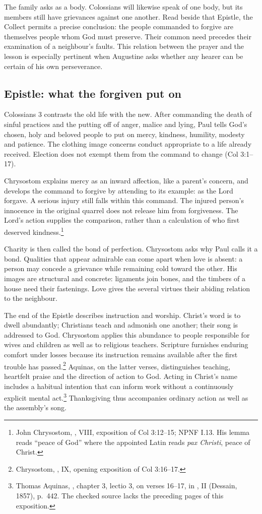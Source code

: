 The family asks as a body. Colossians will likewise speak of one body, but
its members still have grievances against one another. Read beside that
Epistle, the Collect permits a precise conclusion: the people commanded
to forgive are themselves people whom God must preserve. Their common
need precedes their examination of a neighbour's faults. This relation
between the prayer and the lesson is especially pertinent when Augustine
asks whether any hearer can be certain of his own perseverance.

\subsection{Epistle: what the forgiven put on}
Colossians 3 contrasts the old life with the new. After commanding the
death of sinful practices and the putting off of anger, malice and lying,
Paul tells God's chosen, holy and beloved people to put on mercy,
kindness, humility, modesty and patience. The clothing image concerns
conduct appropriate to a life already received. Election does not exempt
them from the command to change (Col 3:1--17).

Chrysostom explains mercy as an inward affection, like a parent's concern,
and develops the command to forgive by attending to its example: as the
Lord forgave. A serious injury still falls within this command. The
injured person's innocence in the original quarrel does not release him
from forgiveness. The Lord's action supplies the comparison, rather than
a calculation of who first deserved kindness.\footnote{John Chrysostom,
, VIII, exposition of Col 3:12--15;
NPNF I.13. His lemma reads ``peace of God'' where the appointed Latin
reads \textit{pax Christi}, peace of Christ.}

Charity is then called the bond of perfection. Chrysostom asks why Paul
calls it a bond. Qualities that appear admirable can come apart when love
is absent: a person may concede a grievance while remaining cold toward
the other. His images are structural and concrete: ligaments join bones,
and the timbers of a house need their fastenings. Love gives the several
virtues their abiding relation to the neighbour.

The end of the Epistle describes instruction and worship. Christ's word
is to dwell abundantly; Christians teach and admonish one another; their
song is addressed to God. Chrysostom applies this abundance to people
responsible for wives and children as well as to religious teachers.
Scripture furnishes enduring comfort under losses because its instruction
remains available after the first trouble has passed.\footnote{Chrysostom,
, IX, opening exposition of Col 3:16--17.}
Aquinas, on the latter verses, distinguishes teaching, heartfelt praise
and the direction of action to God. Acting in Christ's name includes a
habitual intention that can inform work without a continuously explicit
mental act.\footnote{Thomas Aquinas, ,
chapter 3, lectio 3, on verses 16--17, in , II (Dessain, 1857), p.~442. The checked source lacks the
preceding pages of this exposition.} Thanksgiving thus accompanies ordinary
action as well as the assembly's song.

